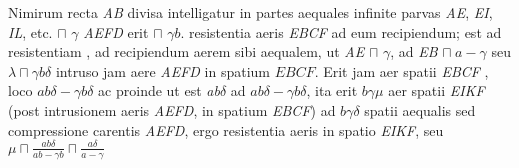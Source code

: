                     \footnotesize Nimirum recta \textit{AB} divisa intelligatur in partes aequales infinite parvas \textit{AE}, \textit{EI}, \textit{IL}, etc.  $\sqcap$ $\gamma$  \textit{AEFD} erit $\sqcap$ $\gamma b$.  resistentia aeris \textit{EBCF} ad eum recipiendum; est ad  resistentiam , ad recipiendum aerem sibi aequalem, ut \textit{AE} $\sqcap$ $\gamma$, ad \textit{EB} $\sqcap \hspace{3pt}a-\gamma$ seu $\lambda \sqcap \gamma b\delta$ intruso jam aere \textit{AEFD} in spatium $EBCF$. Erit jam aer spatii \textit{EBCF} , loco $ab\delta-\gamma b\delta$ ac proinde ut est \textit{ab$\delta$} ad $ab\delta-\gamma b\delta$, ita erit $b\gamma\mu$ aer spatii \textit{EIKF} (post intrusionem aeris \textit{AEFD}, in spatium \textit{EBCF}) ad $b\gamma \delta$  spatii aequalis sed compressione carentis \textit{AEFD}, ergo resistentia aeris in spatio \textit{EIKF}, seu $\displaystyle \mu \sqcap\frac{ab\delta}{ab-\gamma b}\sqcap\frac{a\delta}{a-\gamma}$
